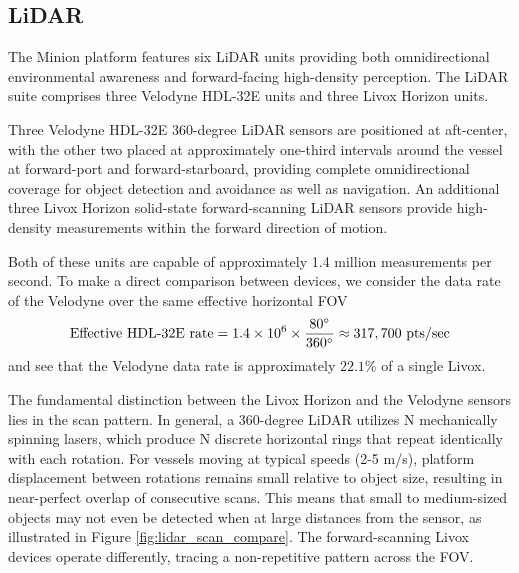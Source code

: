 \documentclass{erauthesis}
\begin{document}

\subsection{LiDAR} \label{sensors_LiDAR}

The Minion platform features six \ac{LiDAR} units providing both omnidirectional environmental awareness and forward-facing high-density perception.
The \ac{LiDAR} suite comprises three Velodyne HDL-32E units and three Livox Horizon units.

Three Velodyne HDL-32E 360-degree \ac{LiDAR} sensors are positioned at aft-center, with the other two placed at approximately one-third intervals around the vessel at forward-port and forward-starboard, providing complete omnidirectional coverage for object detection and avoidance as well as navigation.
An additional three Livox Horizon solid-state forward-scanning \ac{LiDAR} sensors provide high-density measurements within the forward direction of motion.

Both of these units are capable of approximately 1.4 million measurements per second.
To make a direct comparison between devices, we consider the data rate of the Velodyne over the same effective horizontal \ac{FOV}
$$\text{Effective HDL-32E rate} = 1.4 \times 10^6 \times \frac{80 \degree}{360 \degree} \approx 317,700 \text{ pts/sec}$$
and see that the Velodyne data rate is approximately $22.1\%$ of a single Livox.

The fundamental distinction between the Livox Horizon and the Velodyne sensors lies in the scan pattern.
In general, a 360-degree LiDAR utilizes N mechanically spinning lasers, which produce N discrete horizontal rings that repeat identically with each rotation.
For vessels moving at typical speeds (2-5 m/s), platform displacement between rotations remains small relative to object size, resulting in near-perfect overlap of consecutive scans.
This means that small to medium-sized objects may not even be detected when at large distances from the sensor, as illustrated in Figure \ref{fig:lidar_scan_compare}.
The forward-scanning Livox devices operate differently, tracing a non-repetitive pattern across the \ac{FOV}.
\end{document}

